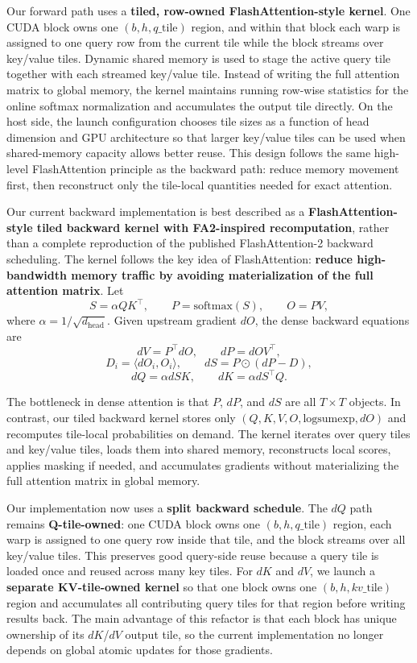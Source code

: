 \documentclass{article}
\begin{document}
Our forward path uses a \textbf{tiled, row-owned FlashAttention-style kernel}. One CUDA block owns one $(b,h,q\_\text{tile})$ region, and within that block each warp is assigned to one query row from the current tile while the block streams over key/value tiles. Dynamic shared memory is used to stage the active query tile together with each streamed key/value tile. Instead of writing the full attention matrix to global memory, the kernel maintains running row-wise statistics for the online softmax normalization and accumulates the output tile directly. On the host side, the launch configuration chooses tile sizes as a function of head dimension and GPU architecture so that larger key/value tiles can be used when shared-memory capacity allows better reuse. This design follows the same high-level FlashAttention principle as the backward path: reduce memory movement first, then reconstruct only the tile-local quantities needed for exact attention.

Our current backward implementation is best described as a \textbf{FlashAttention-style tiled backward kernel with FA2-inspired recomputation}, rather than a complete reproduction of the published FlashAttention-2 backward scheduling. The kernel follows the key idea of FlashAttention: \textbf{reduce high-bandwidth memory traffic by avoiding materialization of the full attention matrix}. Let
\[
S = \alpha QK^\top, \qquad P = \mathrm{softmax}(S), \qquad O = PV,
\]
where $\alpha = 1 / \sqrt{d_{\text{head}}}$. Given upstream gradient $dO$, the dense backward equations are
\[
dV = P^\top dO, \qquad dP = dO V^\top,
\]
\[
D_i = \langle dO_i, O_i \rangle, \qquad dS = P \odot (dP - D),
\]
\[
dQ = \alpha dS K, \qquad dK = \alpha dS^\top Q.
\]

The bottleneck in dense attention is that $P$, $dP$, and $dS$ are all $T \times T$ objects. In contrast, our tiled backward kernel stores only $(Q, K, V, O, \mathrm{logsumexp}, dO)$ and recomputes tile-local probabilities on demand. The kernel iterates over query tiles and key/value tiles, loads them into shared memory, reconstructs local scores, applies masking if needed, and accumulates gradients without materializing the full attention matrix in global memory.

Our implementation now uses a \textbf{split backward schedule}. The $dQ$ path remains \textbf{Q-tile-owned}: one CUDA block owns one $(b,h,q\_\text{tile})$ region, each warp is assigned to one query row inside that tile, and the block streams over all key/value tiles. This preserves good query-side reuse because a query tile is loaded once and reused across many key tiles. For $dK$ and $dV$, we launch a \textbf{separate KV-tile-owned kernel} so that one block owns one $(b,h,kv\_\text{tile})$ region and accumulates all contributing query tiles for that region before writing results back. The main advantage of this refactor is that each block has unique ownership of its $dK$/$dV$ output tile, so the current implementation no longer depends on global atomic updates for those gradients.
\end{document}
